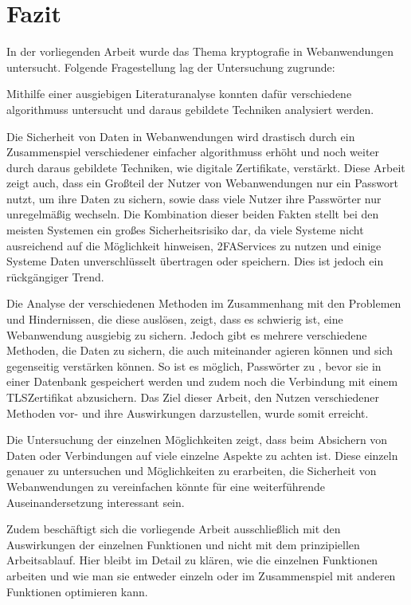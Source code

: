 \newpage
\section{Fazit}\label{sec:fazit}

In der vorliegenden Arbeit wurde das Thema \Gls{kryptografie} in Webanwendungen untersucht.
Folgende Fragestellung lag der Untersuchung zugrunde: \myForschungsfrage\

Mithilfe einer ausgiebigen Literaturanalyse konnten dafür verschiedene  \glspl{algorithmus} untersucht und daraus gebildete Techniken analysiert werden.

Die Sicherheit von Daten in Webanwendungen wird drastisch durch ein Zusammenspiel verschiedener einfacher \glspl{algorithmus} erhöht und noch weiter durch daraus gebildete Techniken, wie \zb digitale Zertifikate, verstärkt.
Diese Arbeit zeigt auch, dass ein Großteil der Nutzer von Webanwendungen nur ein Passwort nutzt, um ihre Daten zu sichern, sowie dass viele Nutzer ihre Passwörter nur unregelmäßig wechseln.
Die Kombination dieser beiden Fakten stellt bei den meisten Systemen ein großes Sicherheitsrisiko dar, da viele Systeme \zb nicht ausreichend auf die Möglichkeit hinweisen, \ac{2FA}\nonbreakdash Services zu nutzen und einige Systeme Daten unverschlüsselt übertragen oder speichern.
Dies ist jedoch ein rückgängiger Trend.

Die Analyse der verschiedenen  Methoden im Zusammenhang mit den Problemen und Hindernissen, die diese auslösen, zeigt, dass es schwierig ist, eine Webanwendung ausgiebig zu sichern.
Jedoch gibt es mehrere verschiedene Methoden, die Daten zu sichern, die auch miteinander agieren können und sich gegenseitig verstärken können.
So ist es möglich, \zb Passwörter zu , bevor sie in einer Datenbank gespeichert werden und zudem noch die Verbindung mit einem \ac{TLS}\nonbreakdash Zertifikat abzusichern.
Das Ziel dieser Arbeit, den Nutzen verschiedener  Methoden vor- und ihre Auswirkungen darzustellen, wurde somit erreicht.

Die Untersuchung der einzelnen Möglichkeiten zeigt, dass beim Absichern von Daten oder Verbindungen auf viele einzelne Aspekte zu achten ist.
Diese einzeln genauer zu untersuchen und Möglichkeiten zu erarbeiten, die Sicherheit von Webanwendungen zu vereinfachen könnte für eine weiterführende Auseinandersetzung interessant sein.

Zudem beschäftigt sich die vorliegende Arbeit ausschließlich mit den Auswirkungen der einzelnen Funktionen und nicht mit dem prinzipiellen Arbeitsablauf.
Hier bleibt im Detail zu klären, wie die einzelnen Funktionen arbeiten und wie man sie entweder einzeln oder im Zusammenspiel mit anderen Funktionen optimieren kann.